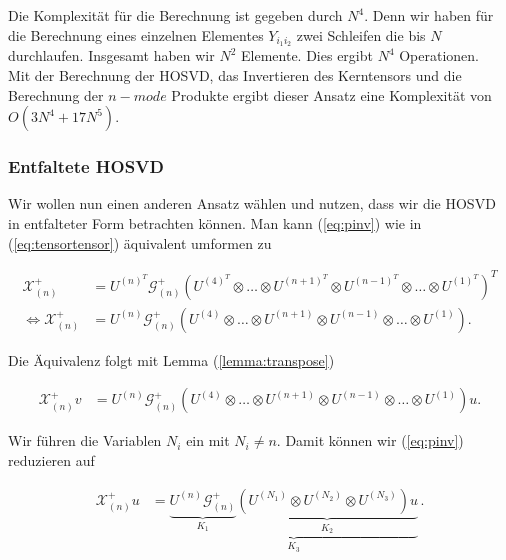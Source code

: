 Die Komplexität für die Berechnung ist gegeben durch $N^4$. Denn wir haben für die Berechnung eines einzelnen Elementes $Y_{i_1 i_2}$ zwei Schleifen die bis $N$ durchlaufen. Insgesamt haben wir $N^2$ Elemente. Dies ergibt $N^4$ Operationen. \\
Mit der Berechnung der HOSVD, das Invertieren des Kerntensors und die Berechnung der $n-mode$ Produkte ergibt dieser Ansatz eine Komplexität von $O(3N^4 + 17N^5)$. \\

\subsubsection{Entfaltete HOSVD}
Wir wollen nun einen anderen Ansatz wählen und nutzen, dass wir die HOSVD in entfalteter Form betrachten können.
Man kann (\ref{eq:pinv}) wie in (\ref{eq:tensortensor}) äquivalent umformen zu

\begin{equation}
\begin{aligned}
\mathscr{X}^{+}_{(n)}  &= U^{ (n) ^{T} }  \mathscr{G}^{+}_{(n)} ( U^{ (4) ^{T} } \otimes \dots \otimes U^{ (n+1) ^{T} } \otimes U^{ (n-1) ^{T} } \otimes \dots \otimes U^{ (1) ^{T} })^{T} \\ \iff
\mathscr{X}^{+}_{(n)} &= U^{ (n)  }  \mathscr{G}^{+}_{(n)} ( U^{ (4)  } \otimes \dots \otimes U^{ (n+1) } \otimes U^{ (n-1) } \otimes \dots \otimes U^{ (1) }).
\end{aligned}
\end{equation}

Die Äquivalenz folgt mit Lemma (\ref{lemma:transpose})

\begin{equation} \label{eq:pinvv}
\begin{aligned}
\mathscr{X}^{+}_{(n)}v&= U^{ (n)  }  \mathscr{G}^{+}_{(n)} ( U^{ (4)  } \otimes \dots \otimes U^{ (n+1) } \otimes U^{ (n-1) } \otimes \dots \otimes U^{ (1) }) u.
\end{aligned}
\end{equation}

Wir führen die Variablen $N_i$ ein mit $N_i \neq n$. Damit können wir (\ref{eq:pinv}) reduzieren auf

\begin{equation} \label{eq:pinvcase}
\begin{aligned}
\mathscr{X}^{+}_{(n)} u&= \underbrace{\underbrace{U^{ (n) }  \mathscr{G}^{+}_{(n)}}_{K_1} \underbrace{( U^{ (N_{1})  } \otimes U^{ (N_{2})}  \otimes U^{ (N_{3}) }) u}_{K_2}}_{K_3} \,.
\end{aligned}
\end{equation}
 


